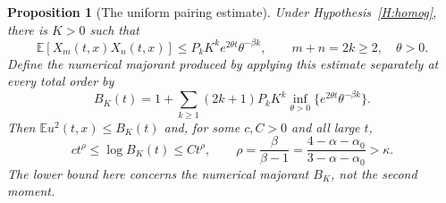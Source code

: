 \documentclass[12pt]{article}
\numberwithin{equation}{section}
\newtheorem{proposition}[theorem]{Proposition}
\theoremstyle{definition}
\newcommand{\E}{\mathbb{E}}
\begin{document}
\begin{proposition}[The uniform pairing estimate]\label{P:envelope}
  Under Hypothesis~\ref{H:homog}, there is $K>0$ such that
  \begin{equation}\label{E:homogeneous-envelope}
    \E[X_m(t,x)X_n(t,x)]
    \le P_k K^k e^{2\theta t}\theta^{-\beta k},
    \qquad m+n=2k\ge2,\quad\theta>0.
  \end{equation}
  Define the numerical majorant produced by applying this estimate
  separately at every total order by
  \begin{equation}\label{E:B-envelope}
    B_K(t)=1+\sum_{k\ge1}(2k+1)P_kK^k
    \inf_{\theta>0}\{e^{2\theta t}\theta^{-\beta k}\}.
  \end{equation}
  Then $\E u^2(t,x)\le B_K(t)$ and, for some $c,C>0$ and all large $t$,
  \begin{equation}\label{E:envelope-growth}
    ct^{\rho}\le\log B_K(t)\le Ct^{\rho},\qquad
    \rho=\frac{\beta}{\beta-1}
    =\frac{4-\alpha-\alpha_0}{3-\alpha-\alpha_0}>\kappa.
  \end{equation}
  The lower bound here concerns the numerical majorant $B_K$, not the
  second moment.
\end{proposition}
\end{document}

